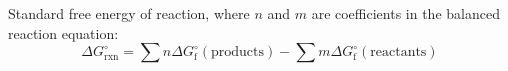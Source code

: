 \documentclass[10pt]{article}
\def\not{^\circ}
\begin{document}
Standard free energy of reaction, where $n$ and $m$ are coefficients in the balanced reaction equation:
\begin{equation*}
\Delta G\not_\textrm{rxn} = \sum{n\Delta G\not_\textrm{f}(\textrm{products})}-\sum{m\Delta G\not_\textrm{f}(\textrm{reactants})}
\end{equation*}




\begin{comment}
\section{Other}

Relationship between mass defect and energy released: 
\begin{equation*}
\Delta E = (\Delta m)c^2
\end{equation*}
\end{comment}
\end{document}
